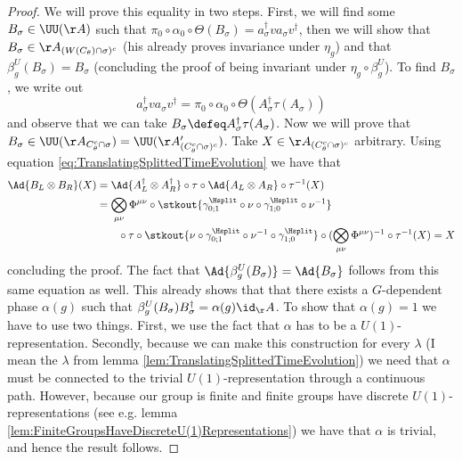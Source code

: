 \begin{proof}
	We will prove this equality in two steps. First, we will find some $B_\sigma\in\UU(\AA)$ such that $\pi_0\circ\alpha_0\circ\Theta(B_\sigma)=a_\sigma^\dagger v a_\sigma v^\dagger$, then we will show that $B_\sigma\in\AA_{(W(C_\theta)\cap\sigma)^c}$ (his already proves invariance under $\eta_g$) and that $\beta_g^{U}(B_\sigma)=B_\sigma$ (concluding the proof of being invariant under $\eta_g\circ\beta_g^U$). To find $B_\sigma$, we write out                                                                                                                                                                                                              
	\begin{equation}
		a_\sigma^\dagger v a_\sigma v^\dagger=\pi_0\circ\alpha_0\circ\Theta(A_\sigma^\dagger\tau(A_\sigma))
	\end{equation}
	and observe that we can take $B_\sigma \defeq A_\sigma^\dagger\tau(A_\sigma)$. Now we will prove that $B_\sigma\in\UU(\AA_{C_\theta^c\cap\sigma})=\UU(\AA_{(C_\theta^c\cap\sigma)^c}')$. Take $X\in\AA_{(C_\theta^c\cap\sigma)^c}$ arbitrary. Using equation \eqref{eq:TranslatingSplittedTimeEvolution} we have that
	\begin{align}
		\Ad{B_L\otimes B_R}(X)&=\Ad{A_L^\dagger\otimes A_R^\dagger}\circ\tau\circ\Ad{A_L\otimes A_R}\circ\tau^{-1}(X)\\
		&=\bigotimes_{\mu\nu}\Phi^{\mu\nu}\circ\stkout{\gamma^{\Hsplit}_{0;1}\circ\nu\circ \gamma^{\Hsplit}_{1;0}\circ\nu^{-1}}\\
		\nonumber
		&\qquad\circ\tau\circ\stkout{\nu\circ\gamma^{\Hsplit}_{0;1}\circ\nu^{-1}\circ\gamma^{\Hsplit}_{1;0}}\circ(\bigotimes_{\mu\nu}\Phi^{\mu\nu})^{-1}\circ\tau^{-1}(X)=X
	\end{align}
	concluding the proof. The fact that $\Ad{\beta_g^{U}(B_\sigma)}=\Ad{B_\sigma}$ follows from this same equation as well. This already shows that that there exists a $G$-dependent phase $\alpha(g)$ such that $\beta_g^{U}(B_\sigma)B_\sigma^\dagger=\alpha(g)\id_\AA$. To show that $\alpha(g)=1$ we have to use two things. First, we use the fact that $\alpha$ has to be a $U(1)$-representation. Secondly, because we can make this construction for every $\lambda$ (I mean the $\lambda$ from lemma \ref{lem:TranslatingSplittedTimeEvolution}) we need that $\alpha$ must be connected to the trivial $U(1)$-representation through a continuous path. However, because our group is finite and finite groups have discrete $U(1)$-representations (see e.g. lemma \ref{lem:FiniteGroupsHaveDiscreteU(1)Representations}) we have that $\alpha$ is trivial, and hence the result follows.
\end{proof}
